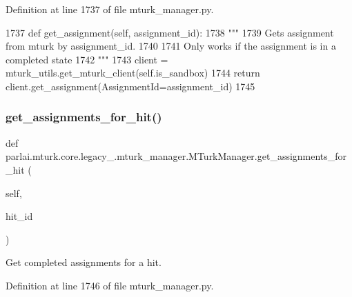 Definition at line 1737 of file mturk\+\_\+manager.\+py.


\begin{DoxyCode}
1737     \textcolor{keyword}{def }get\_assignment(self, assignment\_id):
1738         \textcolor{stringliteral}{"""}
1739 \textcolor{stringliteral}{        Gets assignment from mturk by assignment\_id.}
1740 \textcolor{stringliteral}{}
1741 \textcolor{stringliteral}{        Only works if the assignment is in a completed state}
1742 \textcolor{stringliteral}{        """}
1743         client = mturk\_utils.get\_mturk\_client(self.is\_sandbox)
1744         \textcolor{keywordflow}{return} client.get\_assignment(AssignmentId=assignment\_id)
1745 
\end{DoxyCode}
\mbox{\label{classparlai_1_1mturk_1_1core_1_1legacy__2018_1_1mturk__manager_1_1MTurkManager_a93ac872c0b8f85f39710910aa54eec4b}} 
\subsubsection{\texorpdfstring{get\+\_\+assignments\+\_\+for\+\_\+hit()}{get\_assignments\_for\_hit()}}
{\footnotesize\ttfamily def parlai.\+mturk.\+core.\+legacy\+\_.\+mturk\+\_\+manager.\+M\+Turk\+Manager.\+get\+\_\+assignments\+\_\+for\+\_\+hit (\begin{DoxyParamCaption}\item[{}]{self,  }\item[{}]{hit\+\_\+id }\end{DoxyParamCaption})}

\begin{DoxyVerb}Get completed assignments for a hit.
\end{DoxyVerb}
 

Definition at line 1746 of file mturk\+\_\+manager.\+py.


